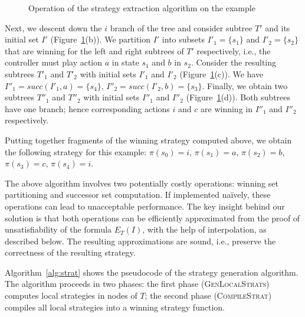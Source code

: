 \begin{example}
\begin{figure}
    \caption{Operation of the strategy extraction algorithm on the example}
    \label{fig:algex}
\end{figure}


Next, we descent down the $i$ branch of the tree and consider 
subtree $T'$ and its initial set $I'$ (Figure~\ref{fig:algex}(b)).  
We partition $I'$ into subsets $I'_1=\{s_1\}$ and $I'_2=\{s_2\}$ 
that are winning for the left and right subtrees of $T'$ 
respectively, i.e., the controller must play action $a$ in state 
$s_1$ and $b$ in $s_2$.  Consider the resulting subtrees $T'_1$ 
and $T'_2$ with initial sets $I'_1$ and $I'_2$ 
(Figure~\ref{fig:algex}(c)).  We have $I''_1 = succ(I'_1, a) = 
\{s_4\}$, $I''_2 = succ(I'_2, b) = \{s_3\}$.  Finally, we obtain 
two subtrees $T''_1$ and $T''_2$ with initial sets $I''_1$ and 
$I''_2$ (Figure~\ref{fig:algex}(d)).  Both subtrees have one branch; 
hence corresponding actions $i$ and $c$ are winning in $I''_1$ and 
$I''_2$ respectively.

Putting together fragments of the winning strategy computed above, 
we obtain the following strategy for this example: $\pi(s_0)=i$, 
$\pi(s_1)=a$, $\pi(s_2)=b$, $\pi(s_3)=c$, $\pi(s_4)=i$.
\end{example}

The above algorithm involves two potentially costly 
operations: winning set partitioning and successor set 
computation.  If implemented na\"ively, these operations can lead 
to unacceptable performance.  The key insight behind our solution 
is that both operations can be efficiently approximated from the 
proof of unsatisfiability of the formula $E_T(I)$, with the help 
of interpolation, as described below.  The resulting 
approximations are sound, i.e., preserve the correctness of the 
resulting strategy.

Algorithm~\ref{alg:strat} shows the pseudocode of the 
strategy generation algorithm.  The algorithm proceeds in two 
phases: the first phase (\textsc{GenLocalStrats}) computes local 
strategies in nodes of $T$; the second phase 
(\textsc{CompileStrat}) compiles all local strategies into a 
winning strategy function.


